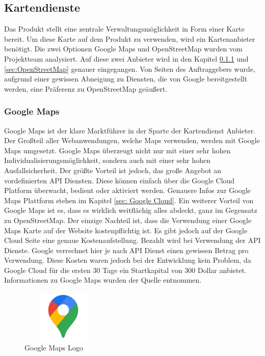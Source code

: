 \subsection{Kartendienste}
Das Produkt stellt eine zentrale Verwaltungsmöglichkeit in Form einer Karte bereit. Um diese Karte auf dem Produkt zu verwenden, wird ein Kartenanbieter benötigt. Die zwei Optionen Google Maps und OpenStreetMap wurden vom Projektteam analysiert. Auf diese zwei Anbieter wird in den Kapitel \ref{sec:Gooogle Map} und \ref{sec:OpenStreetMap} genauer eingegangen. Von Seiten des Auftraggebers wurde, aufgrund einer gewissen Abneigung zu Diensten, die von Google bereitgestellt werden, eine Präferenz zu OpenStreetMap geäußert.
\newpage
\subsubsection{Google Maps} \label{sec:Gooogle Map}


Google Maps ist der klare Marktführer in der Sparte der Kartendienst Anbieter.  Der Großteil  aller Webanwendungen, welche Maps verwenden, werden mit Google Maps umgesetzt. Google Maps überzeugt nicht nur mit einer sehr hohen Individualisierungsmöglichkeit, sondern auch mit einer sehr hohen Ausfallsicherheit. Der größte Vorteil ist jedoch, das große Angebot an vordefinierten API Diensten. Diese können einfach über die Google Cloud Platform überwacht, bedient oder aktiviert werden. Genauere Infos zur Google Maps Plattform stehen im Kapitel \ref{sec: Google Cloud}. Ein weiterer Vorteil von Google Maps ist es, dass es wirklich weitflächig alles abdeckt, ganz im Gegensatz zu OpenStreetMap. Der einzige Nachteil ist, dass die Verwendung einer Google Maps Karte auf der Website kostenpflichtig ist. Es gibt jedoch auf der Google Cloud Seite eine genaue Kostenaufstellung. Bezahlt wird bei Verwendung der API Dienste. Google verrechnet hier je nach API Dienst einen gewissen Betrag pro Verwendung. Diese Kosten waren jedoch bei der Entwicklung kein Problem, da Google Cloud für die ersten 30 Tage ein Startkapital von 300 Dollar anbietet. Informationen zu Google Maps wurden der Quelle \cite{GoogleMaps} entnommen.
\begin{figure}[h]
	\centering
	\includegraphics[height=2.5cm,width=4cm]{images/GoogleMapsLogo}
	\caption{Google Maps Logo}
	\label{fig:GoogleMaps Logo}
\end{figure}

